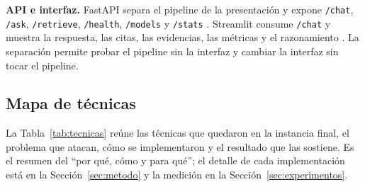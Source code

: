 \textbf{API e interfaz.} FastAPI separa el pipeline de la presentaci\'on y expone \texttt{/chat}, \texttt{/ask}, \texttt{/retrieve}, \texttt{/health}, \texttt{/models} y \texttt{/stats} \cite{fastapidocs}. Streamlit consume \texttt{/chat} y muestra la respuesta, las citas, las evidencias, las m\'etricas y el razonamiento \cite{streamlitdocs}. La separaci\'on permite probar el pipeline sin la interfaz y cambiar la interfaz sin tocar el pipeline.

\subsection{Mapa de t\'ecnicas}

La Tabla~\ref{tab:tecnicas} re\'une las t\'ecnicas que quedaron en la instancia final, el problema que atacan, c\'omo se implementaron y el resultado que las sostiene. Es el resumen del ``por qu\'e, c\'omo y para qu\'e''; el detalle de cada implementaci\'on est\'a en la Secci\'on~\ref{sec:metodo} y la medici\'on en la Secci\'on~\ref{sec:experimentos}.

